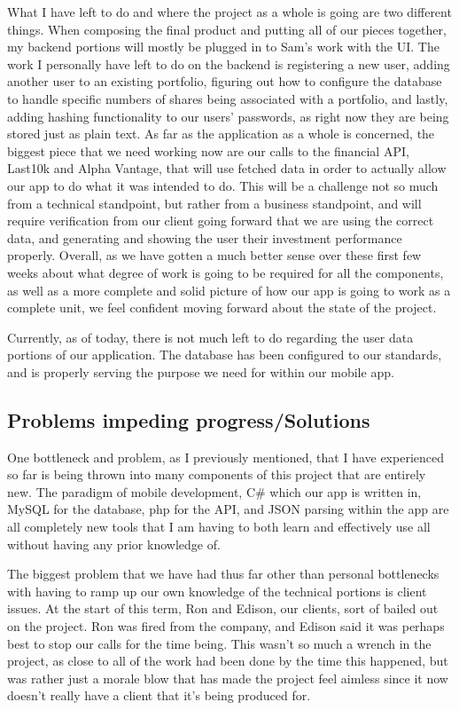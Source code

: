 \documentclass[letterpaper,10pt,titlepage,journal,compsoc,draftclsnofoot,onecolumn]{IEEEtran}
\begin{document}
What I have left to do and where the project as a whole is going are two different things. When composing the final product and putting all of our pieces together, my backend portions will mostly be plugged in to Sam's work with the UI. The work I personally have left to do on the backend is registering a new user, adding another user to an existing portfolio, figuring out how to configure the database to handle specific numbers of shares being associated with a portfolio, and lastly, adding hashing functionality to our users' passwords, as right now they are being stored just as plain text. As far as the application as a whole is concerned, the biggest piece that we need working now are our calls to the financial API, Last10k and Alpha Vantage, that will use fetched data in order to actually allow our app to do what it was intended to do. This will be a challenge not so much from a technical standpoint, but rather from a business standpoint, and will require verification from our client going forward that we are using the correct data, and generating and showing the user their investment performance properly. Overall, as we have gotten a much better sense over these first few weeks about what degree of work is going to be required for all the components, as well as a more complete and solid picture of how our app is going to work as a complete unit, we feel confident moving forward about the state of the project.

Currently, as of today, there is not much left to do regarding the user data portions of our application. The database has been configured to our standards, and is properly serving the purpose we need for within our mobile app.

\subsection{Problems impeding progress/Solutions}

One bottleneck and problem, as I previously mentioned, that I have experienced so far is being thrown into many components of this project that are entirely new. The paradigm of mobile development, C\# which our app is written in, MySQL for the database, php for the API, and JSON parsing within the app are all completely new tools that I am having to both learn and effectively use all without having any prior knowledge of.

The biggest problem that we have had thus far other than personal bottlenecks with having to ramp up our own knowledge of the technical portions is client issues. At the start of this term, Ron and Edison, our clients, sort of bailed out on the project. Ron was fired from the company, and Edison said it was perhaps best to stop our calls for the time being. This wasn't so much a wrench in the project, as close to all of the work had been done by the time this happened, but was rather just a morale blow that has made the project feel aimless since it now doesn't really have a client that it's being produced for.
\end{document}
